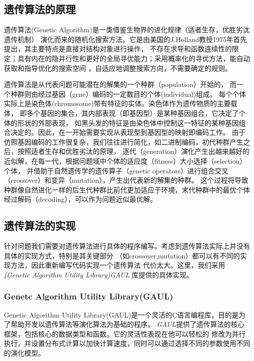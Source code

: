 \documentclass[a4paper]{article}
\begin{document}
\subsection{遗传算法的原理}

遗传算法(Genetic Algorithm)是一类借鉴生物界的进化规律（适者生存，优胜劣汰遗传机制）
演化而来的随机化搜索方法。它是由美国的J.Holland教授1975年首先提出，其主要特点是直接对结构对象进行操作，
不存在求导和函数连续性的限定；具有内在的隐并行性和更好的全局寻优能力；采用概率化的寻优方法，能自动获取和指导优化的搜索空间
，自适应地调整搜索方向，不需要确定的规则。

遗传算法是从代表问题可能潜在的解集的一个种群（population）开始的，
而一个种群则由经过基因（gene）编码的一定数目的个体(individual)组成。
每个个体实际上是染色体(chromosome)带有特征的实体。染色体作为遗传物质的主要载体，
即多个基因的集合，其内部表现（即基因型）是某种基因组合，它决定了个体的形状的外部表现，
如黑头发的特征是由染色体中控制这一特征的某种基因组合决定的。因此，在一开始需要实现从表现型到基因型的映射即编码工作。
由于仿照基因编码的工作很复杂，我们往往进行简化，如二进制编码，初代种群产生之后，按照适者生存和优胜劣汰的原理，
逐代（generation）演化产生出越来越好的近似解，在每一代，根据问题域中个体的适应度（fitness）大小选择（selection）个体，
并借助于自然遗传学的遗传算子（genetic operators）进行组合交叉（crossover）和变异（mutation），产生出代表新的解集的种群。
这个过程将导致种群像自然进化一样的后生代种群比前代更加适应于环境，末代种群中的最优个体经过解码（decoding），可以作为问题近似最优解。

\subsection{遗传算法的实现}

针对问题我们需要对遗传算法进行具体的程序编写。考虑到遗传算法实际上并没有具体的实现方式，特别是其关键部分
（如crossover,mutation）都可以有不同的实现方法，因此重新编写代码实现一个遗传算法
代价太大。这里，我们采用 \emph{(Genetic Algorithm Utility Library)GAUL} 库提供的具体实现。

\subsubsection{Genetc Algorithm Utility Library(GAUL)}
Genetic Algorithm Utility
Library(GAUL)是一个灵活的C语言编程库，目的是为了帮助开发以遗传算法等演化算法为基础的程序。
\emph{GAUL}提供了遗传算法的核心框架，包括核心的数据类型和函数。它的灵活性表现在他可以轻松的
修改为并行执行，并设置分布式计算以加快计算速度，同时可以通过选择不同的参数使用不同的演化模型。
\end{document}

